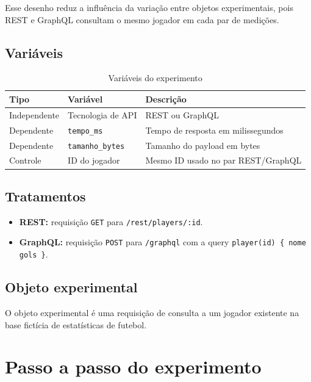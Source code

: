 \documentclass[12pt,a4paper]{article}
\begin{document}
Esse desenho reduz a influência da variação entre objetos experimentais, pois REST e GraphQL consultam o mesmo jogador em cada par de medições.

\subsection{Variáveis}

\begin{table}[H]
\centering
\caption{Variáveis do experimento}
\begin{tabular}{lll}
\toprule
Tipo & Variável & Descrição \\
\midrule
Independente & Tecnologia de API & REST ou GraphQL \\
Dependente & \texttt{tempo\_ms} & Tempo de resposta em milissegundos \\
Dependente & \texttt{tamanho\_bytes} & Tamanho do payload em bytes \\
Controle & ID do jogador & Mesmo ID usado no par REST/GraphQL \\
\bottomrule
\end{tabular}
\end{table}

\subsection{Tratamentos}

\begin{itemize}
  \item \textbf{REST:} requisição \texttt{GET} para \texttt{/rest/players/:id}.
  \item \textbf{GraphQL:} requisição \texttt{POST} para \texttt{/graphql} com a query \texttt{player(id) \{ nome gols \}}.
\end{itemize}

\subsection{Objeto experimental}

O objeto experimental é uma requisição de consulta a um jogador existente na base fictícia de estatísticas de futebol.

\section{Passo a passo do experimento}
\end{document}
